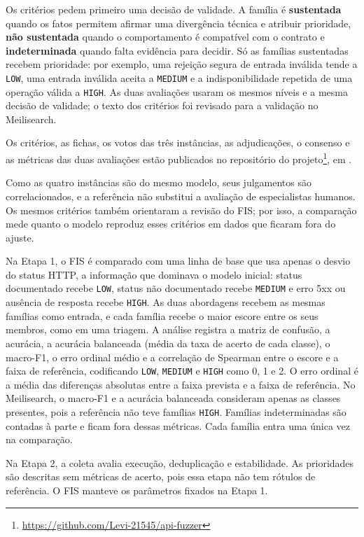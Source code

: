 Os critérios pedem primeiro uma decisão de validade. A família é
\textbf{sustentada} quando os fatos permitem afirmar uma divergência técnica e
atribuir prioridade, \textbf{não sustentada} quando o comportamento é
compatível com o contrato e \textbf{indeterminada} quando falta evidência para
decidir. Só as famílias sustentadas recebem prioridade: por exemplo, uma
rejeição segura de entrada inválida tende a \texttt{LOW}, uma entrada inválida
aceita a \texttt{MEDIUM} e a indisponibilidade repetida de uma operação válida
a \texttt{HIGH}. As duas avaliações usaram os mesmos níveis e a mesma decisão
de validade; o texto dos critérios foi revisado para a validação no
Meilisearch.

Os critérios, as fichas, os votos das três instâncias, as adjudicações, o
consenso e as métricas das duas avaliações estão publicados no repositório do
projeto\footnote{\url{https://github.com/Levi-21545/api-fuzzer}}, em
.

Como as quatro instâncias são do mesmo modelo, seus julgamentos são
correlacionados, e a referência não substitui a avaliação de especialistas
humanos. Os mesmos critérios também orientaram a revisão do FIS; por isso, a
comparação mede quanto o modelo reproduz esses critérios em dados que ficaram
fora do ajuste.

Na Etapa 1, o FIS é comparado com uma linha de base que usa apenas o desvio do
status HTTP, a informação que dominava o modelo inicial: status documentado recebe
\texttt{LOW}, status não documentado recebe \texttt{MEDIUM} e erro 5xx ou
ausência de resposta recebe \texttt{HIGH}. As duas abordagens recebem as mesmas
famílias como entrada, e cada família recebe o maior escore entre os seus
membros, como em uma triagem. A análise registra a matriz de confusão, a
acurácia, a acurácia balanceada (média da taxa de acerto de cada classe), o
macro-F1, o erro ordinal médio e a correlação de Spearman entre o escore e a
faixa de referência, codificando \texttt{LOW}, \texttt{MEDIUM} e \texttt{HIGH}
como 0, 1 e 2. O erro ordinal é a média das diferenças absolutas entre a faixa
prevista e a faixa de referência. No Meilisearch, o macro-F1 e a acurácia
balanceada consideram apenas as classes presentes, pois a referência não teve
famílias \texttt{HIGH}. Famílias indeterminadas são contadas à parte e ficam
fora dessas métricas. Cada família entra uma única vez na comparação.

Na Etapa 2, a coleta avalia execução, deduplicação e estabilidade. As
prioridades são descritas sem métricas de acerto, pois essa etapa não tem
rótulos de referência. O FIS manteve os parâmetros fixados na Etapa 1.

